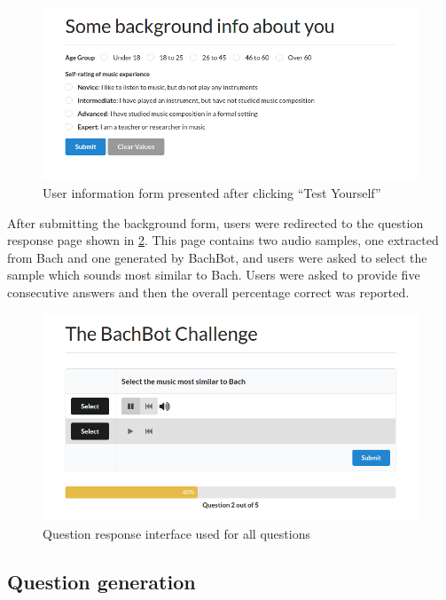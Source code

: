 \begin{figure}[tb]
  \centering
  \includegraphics[width=1.0\linewidth]{user-info-form.png}
  \caption{User information form presented after clicking ``Test Yourself''}
  \label{fig:user-info-form}
\end{figure}

After submitting the background form, users were redirected to the question
response page shown in \cref{fig:question-screen}. This page contains two
audio samples, one extracted from Bach and one generated by BachBot, and users
were asked to select the sample which sounds most similar to Bach. Users were
asked to provide five consecutive answers and then the overall percentage
correct was reported.

\begin{figure}[tb]
  \centering
  \includegraphics[width=1.0\linewidth]{question-screen.png}
  \caption{Question response interface used for all questions}
  \label{fig:question-screen}
\end{figure}

\subsection{Question generation}

